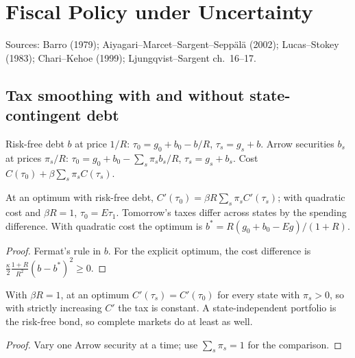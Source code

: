 \chapter{Fiscal Policy under Uncertainty}
\label{chap:fiscal_uncertainty}

Sources: Barro (1979); Aiyagari--Marcet--Sargent--Sepp\"al\"a (2002); Lucas--Stokey (1983); Chari--Kehoe (1999);
Ljungqvist--Sargent ch.~16--17.

\section{Tax smoothing with and without state-contingent debt}

\begin{definition}
\label{def:amss}
\leanok
Risk-free debt $b$ at price $1/R$: $\tau_0=g_0+b_0-b/R$, $\tau_s=g_s+b$. Arrow securities $b_s$ at prices $\pi_s/R$:
$\tau_0=g_0+b_0-\sum_s\pi_sb_s/R$, $\tau_s=g_s+b_s$. Cost $C(\tau_0)+\beta\sum_s\pi_sC(\tau_s)$.
\end{definition}

\begin{theorem}
\label{thm:amss_rf}
\leanok
{}
At an optimum with risk-free debt, $C'(\tau_0)=\beta R\sum_s\pi_sC'(\tau_s)$; with quadratic cost and $\beta R=1$,
$\tau_0=E\tau_1$. Tomorrow's taxes differ across states by the spending difference. With quadratic cost the optimum is
$b^*=R(g_0+b_0-Eg)/(1+R)$.
\end{theorem}
\begin{proof}
\leanok
Fermat's rule in $b$. For the explicit optimum, the cost difference is $\frac{\kappa}{2}\frac{1+R}{R^2}(b-b^*)^2\ge0$.
\end{proof}

\begin{theorem}
\label{thm:amss_cm}
\leanok
{}
With $\beta R=1$, at an optimum $C'(\tau_s)=C'(\tau_0)$ for every state with $\pi_s>0$, so with strictly increasing $C'$
the tax is constant. A state-independent portfolio is the risk-free bond, so complete markets do at least as well.
\end{theorem}
\begin{proof}
\leanok
Vary one Arrow security at a time; use $\sum_s\pi_s=1$ for the comparison.
\end{proof}


